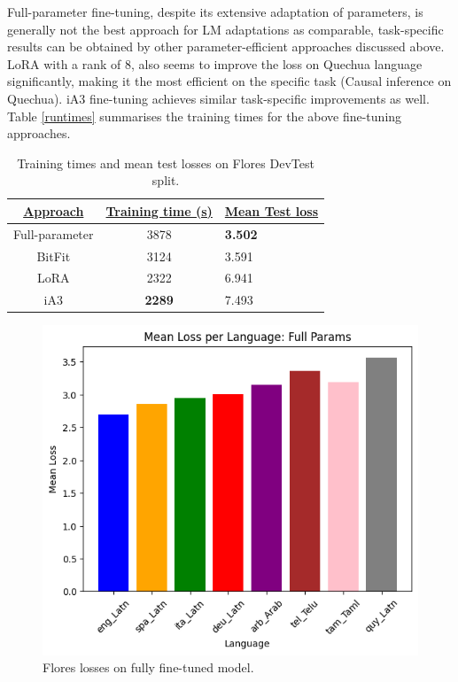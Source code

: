 \documentclass[11pt]{article}
\begin{document}
Full-parameter fine-tuning, despite its extensive adaptation of parameters, is generally not the best approach for LM adaptations as comparable, task-specific results can be obtained by other parameter-efficient approaches discussed above. LoRA with a rank of 8, also seems to improve the loss on Quechua language significantly, making it the most efficient on the specific task (Causal inference on Quechua). iA3 fine-tuning achieves similar task-specific improvements as well. Table \ref{runtimes} summarises the training times for the above fine-tuning approaches. 


\begin{table}[]
\begin{tabular}{@{}ccl@{}}
\toprule
{\ul \textbf{Approach}} & {\ul \textbf{Training time (s)}} & {\ul \textbf{Mean Test loss}} \\ \midrule
Full-parameter          & 3878                             & \textbf{3.502}                          \\
BitFit                  & 3124                             & 3.591                                   \\
LoRA                    & 2322                             & 6.941                                   \\
iA3                     & \textbf{2289}                    & 7.493                                   \\ \bottomrule
\end{tabular}
\caption{Training times and mean test losses on Flores DevTest split.}
\end{table}


\begin{figure}[ht]
\centering
\includegraphics[width=0.9\columnwidth]{loss_ft.png}
\caption{Flores losses on fully fine-tuned model.}
\label{loss_ft}
\end{figure}
\end{document}
